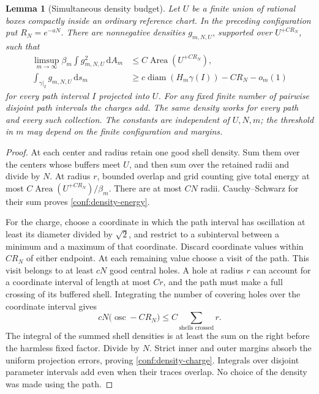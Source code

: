 \documentclass[11pt]{article}
\numberwithin{equation}{section}
\newtheorem{lemma}[theorem]{Lemma}
\theoremstyle{definition}
\theoremstyle{remark}
\newcommand{\dd}{\mathrm d}
\newcommand{\1}{\mathbf 1}
\DeclareMathOperator{\diam}{diam}
\DeclareMathOperator{\Area}{Area}
\begin{document}
\begin{lemma}[Simultaneous density budget]
\label{conf:density-budget}
Let \(U\) be a finite union of rational boxes compactly inside an
ordinary reference chart.  In the preceding configuration put
\(R_N=e^{-aN}\).  There are nonnegative densities \(g_{m,N,U}\),
supported over \(U^{+CR_N}\), such that
\begin{align}
 \limsup_{m\to\infty}\beta_m
       \int g_{m,N,U}^{2}\,\dd A_m
       &\le C\Area(U^{+CR_N}),
       \label{conf:density-energy}\\
 \int_{\gamma|_I}g_{m,N,U}\,\dd s_m
       &\ge c\diam(H_m\gamma(I))-CR_N-o_m(1)
       \label{conf:density-charge}
\end{align}
for every path interval \(I\) projected into \(U\).
For any fixed finite number of pairwise disjoint path intervals the
charges add.  The same density works for every path and every such
collection.  The constants are independent of \(U,N,m\); the
threshold in \(m\) may depend on the finite configuration and margins.
\end{lemma}

\begin{proof}
At each center and radius retain one good shell density.  Sum them over
the centers whose buffers meet \(U\), and then sum over the retained
radii and divide by \(N\).  At radius \(r\), bounded overlap and
grid counting give total energy at most
\(C\Area(U^{+CR_N})/\beta_m\).  There are at most \(CN\) radii.
Cauchy--Schwarz for their sum proves
\eqref{conf:density-energy}.

For the charge, choose a coordinate in which the path interval has
oscillation at least its diameter divided by \(\sqrt2\), and restrict
to a subinterval between a minimum and a maximum of that coordinate.
Discard coordinate values within \(CR_N\) of either endpoint.  At
each remaining value choose a visit of the path.  This visit belongs
to at least \(cN\) good central holes.  A hole at radius \(r\) can
account for a coordinate interval of length at most \(Cr\), and the
path must make a full crossing of its buffered shell.  Integrating the
number of covering holes over the coordinate interval gives
\[
 cN\bigl(\operatorname{osc}-CR_N\bigr)
       \le C\sum_{\text{shells crossed}}r.
\]
The integral of the summed shell densities is at least the sum on the
right before the harmless fixed factor.  Divide by \(N\).  Strict
inner and outer margins absorb the uniform projection errors, proving
\eqref{conf:density-charge}.  Integrals over disjoint parameter
intervals add even when their traces overlap.  No choice of the density
was made using the path.
\end{proof}
\end{document}
